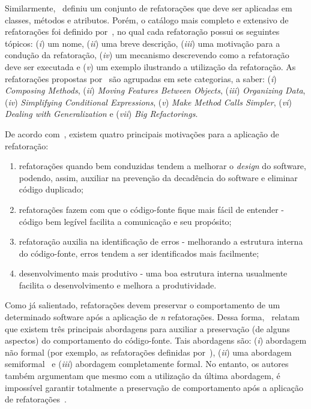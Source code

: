 Similarmente,~ definiu um conjunto de refatorações que deve ser aplicadas em classes, métodos e atributos. Porém, o catálogo mais completo e extensivo de refatorações foi definido por~, no qual cada refatoração possui os seguintes tópicos: (\textit{i}) um nome, (\textit{ii}) uma breve descrição, (\textit{iii}) uma motivação para a condução da refatoração, (\textit{iv}) um mecanismo descrevendo como a refatoração deve ser executada e (\textit{v}) um exemplo ilustrando a utilização da refatoração. As refatorações propostas por~ são agrupadas em sete categorias, a saber: (\textit{i}) \textit{Composing Methods}, (\textit{ii}) \textit{Moving Features Between Objects}, (\textit{iii}) \textit{Organizing Data}, (\textit{iv}) \textit{Simplifying Conditional Expressions}, (\textit{v}) \textit{Make Method Calls Simpler}, (\textit{vi}) \textit{Dealing with Generalization} e (\textit{vii}) \textit{Big Refactorings}.

De acordo com~, existem quatro principais motivações para a aplicação de refatoração:

\begin{enumerate}
	\item refatorações quando bem conduzidas tendem a melhorar o \textit{design} do software, podendo, assim, auxiliar na prevenção da decadência do software e eliminar código duplicado;
	\item refatorações fazem com que o código-fonte fique mais fácil de entender - código bem legível facilita a comunicação e seu propósito;
	\item refatoração auxilia na identificação de erros - melhorando a estrutura interna do código-fonte, erros tendem a ser identificados mais facilmente;
	\item desenvolvimento mais produtivo - uma boa estrutura interna usualmente facilita o desenvolvimento e melhora a produtividade.
\end{enumerate}

Como já salientado, refatorações devem preservar o comportamento de um determinado software após a aplicação de \textit{n} refatorações. Dessa forma,~ relatam que existem três principais abordagens para auxiliar a preservação (de alguns aspectos) do comportamento do código-fonte. Tais abordagens são: (\textit{i}) abordagem não formal (por exemplo, as refatorações definidas por~), (\textit{ii}) uma abordagem semiformal~\cite{Roberts_1999} e (\textit{iii}) abordagem completamente formal. No entanto, os autores também argumentam que mesmo com a utilização da última abordagem, é impossível garantir totalmente a preservação de comportamento após a aplicação de refatorações~\cite{Mens04,Cinneide_2000}. 


